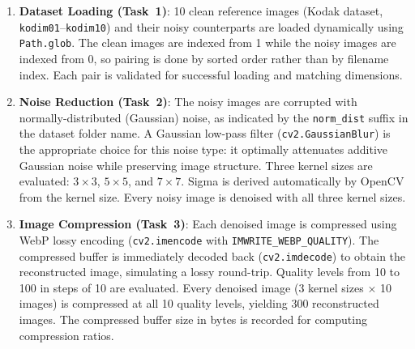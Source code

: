 \documentclass[11pt,a4paper]{article}
\begin{document}
\begin{enumerate}[leftmargin=*]
    \item \textbf{Dataset Loading (Task~1)}:
        10 clean reference images (Kodak dataset, \texttt{kodim01}--\texttt{kodim10}) and their noisy counterparts are loaded dynamically using \texttt{Path.glob}.
        The clean images are indexed from 1 while the noisy images are indexed from 0, so pairing is done by sorted order rather than by filename index.
        Each pair is validated for successful loading and matching dimensions.

    \item \textbf{Noise Reduction (Task~2)}:
        The noisy images are corrupted with normally-distributed (Gaussian) noise, as indicated by the \texttt{norm\_dist} suffix in the dataset folder name.
        A Gaussian low-pass filter (\texttt{cv2.GaussianBlur}) is the appropriate choice for this noise type: it optimally attenuates additive Gaussian noise while preserving image structure.
        Three kernel sizes are evaluated: $3\times3$, $5\times5$, and $7\times7$.
        Sigma is derived automatically by OpenCV from the kernel size.
        Every noisy image is denoised with all three kernel sizes.

    \item \textbf{Image Compression (Task~3)}:
        Each denoised image is compressed using WebP lossy encoding (\texttt{cv2.imencode} with \texttt{IMWRITE\_WEBP\_QUALITY}).
        The compressed buffer is immediately decoded back (\texttt{cv2.imdecode}) to obtain the reconstructed image, simulating a lossy round-trip.
        Quality levels from 10 to 100 in steps of 10 are evaluated.
        Every denoised image (3 kernel sizes $\times$ 10 images) is compressed at all 10 quality levels, yielding 300 reconstructed images.
        The compressed buffer size in bytes is recorded for computing compression ratios.


\end{enumerate}
\end{document}
